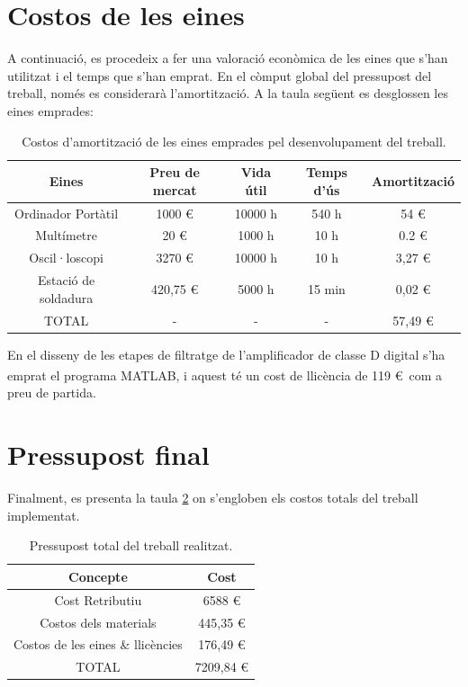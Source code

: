 \section{Costos de les eines}
\par A continuació, es procedeix a fer una valoració econòmica de les eines que s'han utilitzat i el temps que s'han emprat. En el còmput global del pressupost del treball, només es considerarà l'amortització. A la taula següent es desglossen les eines emprades:
\begin{table}[H]
    \centering
    \begin{tabular}{ | c | c | c | c | c |}
    \hline
    \centering
    \textbf{Eines}     &  \textbf{Preu de mercat} & \textbf{Vida útil}  & \textbf{Temps d'ús} & \textbf{Amortització}\\ [2ex] \hline
    \centering
    Ordinador Portàtil    &  1000 \euro &  10000 h  &  540 h  &  54 \euro\\ \hline
    \centering
    Multímetre    &    20 \euro &  1000 h  &  10 h  &  0.2 \euro\\ \hline
    \centering
    Oscil·loscopi    &    3270 \euro &  10000 h  &  10 h  &  3,27 \euro\\ \hline
    \centering
    Estació de soldadura   &    420,75 \euro &  5000 h  &  15 min  &  0,02 \euro\\ \hline
    \centering
    \textsc{TOTAL}    &    - &  -  &  -  &  57,49 \euro\\ \hline
    \end{tabular}
    \caption{Costos d'amortització de les eines emprades pel desenvolupament del treball.}
    \label{taula_eines}
\end{table}

\par En el disseny de les etapes de filtratge de l'amplificador de classe D digital s'ha emprat el programa MATLAB\textsuperscript{\tiny\textregistered}, i aquest té un cost de llicència de 119 \euro \ com a preu de partida.\cite{MATLABlic}

\section{Pressupost final}
\par Finalment, es presenta la taula \ref{taula_pressupost} on s'engloben els costos totals del treball implementat.
\begin{table}[H]
    \centering
    \begin{tabular}{ | c | c | }
    \hline
    \centering
    \textbf{Concepte}     &  \textbf{Cost}\\ [2ex] \hline
    \centering
    Cost Retributiu    &    6588 \euro \\ \hline
    \centering
    Costos dels materials    &    445,35 \euro \\ \hline
    \centering
    Costos de les eines \& llicències   &    176,49 \euro \\ \hline
    \centering
    \textsc{TOTAL}    &    7209,84 \euro \\ \hline
    \end{tabular}
    \caption{Pressupost total del treball realitzat.}
    \label{taula_pressupost}
\end{table}